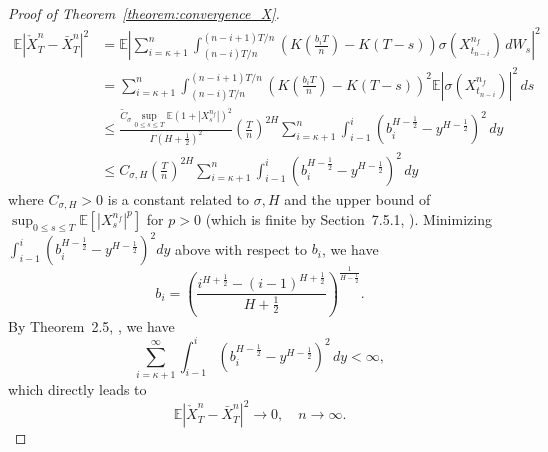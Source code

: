 \documentclass[11pt]{article}%
\theoremstyle{definition}
\begin{document}
\begin{proof}[Proof of Theorem~\ref{theorem:convergence_X}]
\begin{align}
        \mathbb{E}|\check{X}_T^n - \bar{X}_T^n|^2 &= \mathbb{E} \left|\sum_{i=\kappa+1}^{n} \int_{(n-i)T/n}^{(n-i+1)T/n} \left(K\left(\frac{b_i T}{n}\right) - K(T-s)\right) \sigma(X_{t_{n-i}}^{n_f}) \,dW_s\right|^2\nonumber\\ 
        &= \sum_{i=\kappa+1}^{n} \int_{(n-i)T/n}^{(n-i+1)T/n} \left(K\left(\frac{b_i T}{n}\right) - K(T-s)\right)^2 \mathbb{E} |\sigma(X_{t_{n-i}}^{n_f})|^2\,ds\nonumber\\
        &\le \frac{\widetilde{C}_\sigma \sup_{0\le s \le T} \mathbb{E} (1 + |X_s^{n_f}|)^2}{\Gamma(H+\frac{1}{2})^2} \left(\frac{T}{n}\right)^{2H}\sum_{i=\kappa+1}^{n}  \int_{i-1}^{i} (b_i^{H-\frac{1}{2}} - y^{H-\frac{1}{2}})^2\,dy\nonumber\\
        &\le C_{\sigma,H}\left(\frac{T}{n}\right)^{2H} \sum_{i=\kappa+1}^{n}  \int_{i-1}^{i} (b_i^{H-\frac{1}{2}} - y^{H-\frac{1}{2}})^2\,dy\label{eq:checkX_barXn}
    \end{align}
    where \(C_{\sigma,H}>0\) is a constant related to \(\sigma, H\) and the upper bound of \(\sup_{0\le s \le T} \mathbb{E}[|X_s^{n_f}|^p]\) for \(p>0\) (which is finite by Section~7.5.1, \cite{abijaber2018}). Minimizing \(\int_{i-1}^{i} (b_i^{H-\frac{1}{2}} - y^{H-\frac{1}{2}})^2 dy\) above with respect to \(b_i\), we have 
    \begin{equation}
        b_i = \left(\frac{i^{H+\frac{1}{2}} - (i-1)^{H+\frac{1}{2}}}{H+\frac{1}{2}}\right)^{\frac{1}{H-\frac{1}{2}}}.\label{eq:optimal_bi}
    \end{equation}
    By Theorem~2.5, \cite{bennedsen_2017_FS}, we have 
    \[
    \sum_{i=\kappa+1}^{\infty}  \int_{i-1}^{i} (b_i^{H-\frac{1}{2}} - y^{H-\frac{1}{2}})^2\,dy < \infty,
    \]
    which directly leads to
    \[
        \mathbb{E}|\check{X}_T^n - \bar{X}_T^n|^2 \to 0,\quad n\to \infty.
    \]


\end{proof}
\end{document}
